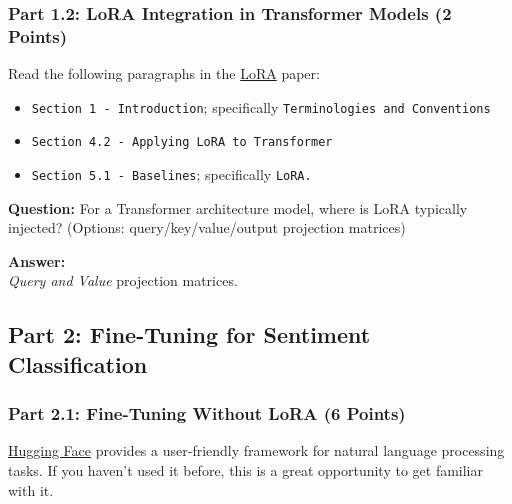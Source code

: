 \documentclass[11pt, oneside]{article}   	%
\begin{document}
\subsubsection*{Part 1.2: LoRA Integration in Transformer Models (2 Points)}
Read the following paragraphs in the \href{https://arxiv.org/abs/2106.09685}{LoRA} paper:
\begin{itemize}
    \item \texttt{Section 1 - Introduction}; specifically \texttt{Terminologies and Conventions}
    \item \texttt{Section 4.2 - Applying LoRA to Transformer}
    \item \texttt{Section 5.1 - Baselines}; specifically \texttt{LoRA.}
\end{itemize}
\textbf{Question:}
For a Transformer architecture model, where is LoRA typically injected? (Options: query/key/value/output projection matrices)

\textbf{Answer:} \\
\textit{Query and Value} projection matrices.

\subsection*{Part 2:  Fine-Tuning for Sentiment Classification}
\subsubsection*{Part 2.1: Fine-Tuning Without LoRA (6 Points)}
\href{https://huggingface.co/}{Hugging Face} provides a user-friendly framework for natural language processing tasks. If you haven't used it before, this is a great opportunity to get familiar with it. 
\end{document}

